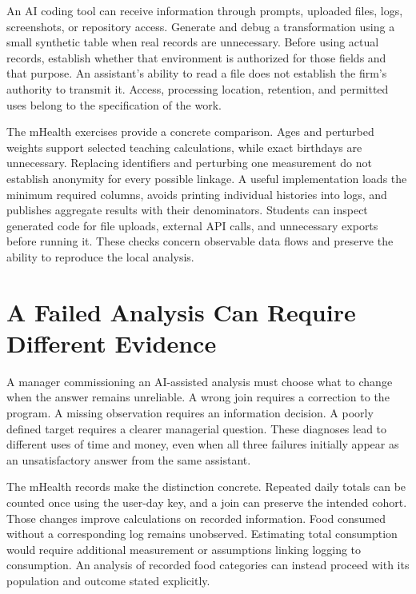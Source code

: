 An AI coding tool can receive information through prompts, uploaded
files, logs, screenshots, or repository access. Generate and debug a
transformation using a small synthetic table when real records are
unnecessary. Before using actual records, establish whether that
environment is authorized for those fields and that purpose. An
assistant's ability to read a file does not establish the firm's
authority to transmit it. Access, processing location, retention, and
permitted uses belong to the specification of the work.

The mHealth exercises provide a concrete comparison. Ages and perturbed
weights support selected teaching calculations, while exact birthdays
are unnecessary. Replacing identifiers and perturbing one measurement do
not establish anonymity for every possible linkage. A useful
implementation loads the minimum required columns, avoids printing
individual histories into logs, and publishes aggregate results with
their denominators. Students can inspect generated code for file
uploads, external API calls, and unnecessary exports before running it.
These checks concern observable data flows and preserve the ability to
reproduce the local analysis.

\hypertarget{M01-a-failed-analysis-can-require-different-evidence}{%
\section{A Failed Analysis Can Require Different
Evidence}\label{M01-a-failed-analysis-can-require-different-evidence}}

\noindent \noindent A manager commissioning an AI-assisted analysis must choose
what to change when the answer remains unreliable. A wrong join requires
a correction to the program. A missing observation requires an
information decision. A poorly defined target requires a clearer
managerial question. These diagnoses lead to different uses of time and
money, even when all three failures initially appear as an
unsatisfactory answer from the same assistant.

The mHealth records make the distinction concrete. Repeated daily totals
can be counted once using the user-day key, and a join can preserve the
intended cohort. Those changes improve calculations on recorded
information. Food consumed without a corresponding log remains
unobserved. Estimating total consumption would require additional
measurement or assumptions linking logging to consumption. An analysis
of recorded food categories can instead proceed with its population and
outcome stated explicitly.

